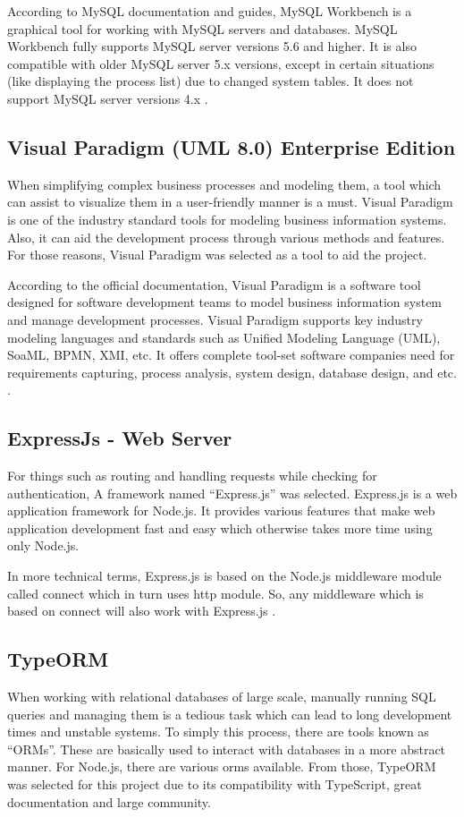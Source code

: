 \documentclass[12pt]{report}
\begin{document}
According to MySQL documentation and guides, MySQL Workbench is a graphical tool for working with MySQL servers and databases. MySQL Workbench fully supports MySQL server versions 5.6 and higher. It is also compatible with older MySQL server 5.x versions, except in certain situations (like displaying the process list) due to changed system tables. It does not support MySQL server versions 4.x \cite{mclaughlin_2013_mysql}.

\subsection{Visual Paradigm (UML 8.0) Enterprise Edition}
When simplifying complex business processes and modeling them, a tool which can assist to visualize them in a user-friendly manner is a must. Visual Paradigm is one of the industry standard tools for modeling business information systems. Also, it can aid the development process through various methods and features. For those reasons, Visual Paradigm was selected as a tool to aid the project.

According to the official documentation, Visual Paradigm is a software tool designed for software development teams to model business information system and manage development processes. Visual Paradigm supports key industry modeling languages and standards such as Unified Modeling Language (UML), SoaML, BPMN, XMI, etc. It offers complete tool-set software companies need for requirements capturing, process analysis, system design, database design, and etc. \cite{vparadigm_2020_introduction}.

\subsection{ExpressJs - Web Server}
For things such as routing and handling requests while checking for authentication, A framework named ``Express.js'' was selected. Express.js is a web application framework for Node.js. It provides various features that make web application development fast and easy which otherwise takes more time using only Node.js.

In more technical terms, Express.js is based on the Node.js middleware module called connect which in turn uses http module. So, any middleware which is based on connect will also work with Express.js \cite{azatmardan_2014_expressjs}.

\subsection{TypeORM}
When working with relational databases of large scale, manually running SQL queries and managing them is a tedious task which can lead to long development times and unstable systems. To simply this process, there are tools known as ``ORMs''. These are basically used to interact with databases in a more abstract manner. For Node.js, there are various \acrshort{orm}s available. From those, TypeORM was selected for this project due to its compatibility with TypeScript, great documentation and large community.
\end{document}

